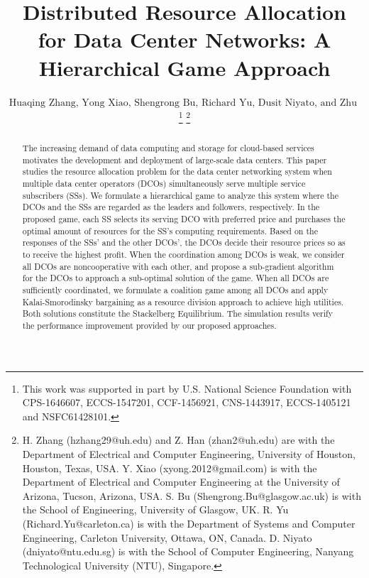 \documentclass[twocolumn,10pt]{IEEEtran}
\begin{document}





\title{Distributed Resource Allocation for Data Center Networks: A Hierarchical Game Approach}




\author{\normalsize
$\mbox{ Huaqing Zhang, Yong Xiao, Shengrong Bu, Richard Yu, Dusit Niyato, and Zhu Han }$\\
\thanks{This work was supported in part by U.S. National Science Foundation with CPS-1646607, ECCS-1547201, CCF-1456921, CNS-1443917, ECCS-1405121 and NSFC61428101.}
\thanks{H. Zhang (hzhang29@uh.edu) and Z. Han (zhan2@uh.edu) are with the Department of Electrical and Computer Engineering, University of Houston, Houston, Texas, USA. Y. Xiao (xyong.2012@gmail.com) is with the Department of Electrical and Computer Engineering at the University of Arizona, Tucson, Arizona, USA. S. Bu (Shengrong.Bu@glasgow.ac.uk) is with the School of Engineering, University of Glasgow, UK. R. Yu (Richard.Yu@carleton.ca) is with the Department of Systems and Computer Engineering, Carleton University, Ottawa, ON, Canada. D. Niyato (dniyato@ntu.edu.sg) is with the School of Computer Engineering, Nanyang Technological University (NTU), Singapore.}
}
\maketitle

\vspace{-2cm}

\begin{abstract}
The increasing demand of data computing and storage for cloud-based services motivates the development and deployment of large-scale data centers. This paper studies the resource allocation problem for the data center networking system when multiple data center operators (DCOs) simultaneously serve multiple service subscribers (SSs). We formulate a hierarchical game to analyze this system where the DCOs and the SSs are regarded as the leaders and followers, respectively. In the proposed game, each SS selects its serving DCO with preferred price and purchases the optimal amount of resources for the SS's computing requirements. Based on the responses of the SSs' and the other DCOs', the DCOs decide their resource prices so as to receive the highest profit. When the coordination among DCOs is weak, we consider all DCOs are noncooperative with each other, and propose a sub-gradient algorithm for the DCOs to approach a sub-optimal solution of the game. When all DCOs are sufficiently coordinated, we formulate a coalition game among all DCOs and apply Kalai-Smorodinsky bargaining as a resource division approach to achieve high utilities. Both solutions constitute the Stackelberg Equilibrium. The simulation results verify the performance improvement provided by our proposed approaches.
\end{abstract}
\end{document}
